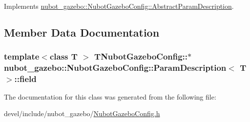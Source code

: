 Implements \hyperlink{classnubot__gazebo_1_1NubotGazeboConfig_1_1AbstractParamDescription_a02c545d049eb544dcffe0af14d5c4ad3}{nubot\-\_\-gazebo\-::\-Nubot\-Gazebo\-Config\-::\-Abstract\-Param\-Description}.



\subsection{Member Data Documentation}
\hypertarget{classnubot__gazebo_1_1NubotGazeboConfig_1_1ParamDescription_a5252b8adc5a8ac376dbc89fa19b25af8}{
\subsubsection[{field}]{\setlength{\rightskip}{0pt plus 5cm}template$<$class T $>$ T\-Nubot\-Gazebo\-Config\-::$\ast$ {\bf nubot\-\_\-gazebo\-::\-Nubot\-Gazebo\-Config\-::\-Param\-Description}$<$ T $>$\-::field}}\label{classnubot__gazebo_1_1NubotGazeboConfig_1_1ParamDescription_a5252b8adc5a8ac376dbc89fa19b25af8}


The documentation for this class was generated from the following file\-:\begin{DoxyCompactItemize}
\item 
devel/include/nubot\-\_\-gazebo/\hyperlink{NubotGazeboConfig_8h}{Nubot\-Gazebo\-Config.\-h}\end{DoxyCompactItemize}
